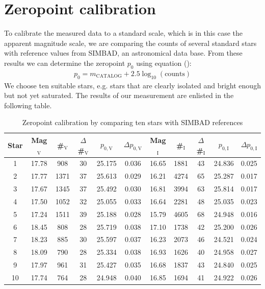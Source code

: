 \section{Zeropoint calibration}\label{sec:zeropoint}
To calibrate the measured data to a standard scale, which is in this case the apparent magnitude scale, we are comparing the counts of several standard stars with reference values from SIMBAD, an astronomical data base. From these results we can determine the zeropoint $p_0$ using equation (): %
	\begin{align}
		p_0 = m_{\text{CATALOG}} + 2.5\log_{10}(\text{counts})
	\end{align}
	We choose ten suitable stars, e.g. stars that are clearly isolated and bright enough but not yet saturated. 
\newpage
The results of our measurement are enlisted in the following table.
	
	\begin{table}[H]
\setlength{\tabcolsep}{2mm}
\renewcommand{\arraystretch}{1.5}
\begin{adjustbox}{width=\textwidth} 
\begin{tabular}{|c||c|c|c|c|c||c|c|c|c|c|}
\hline
Star & Mag$_{\text{V}}$ & \#$_{\text{V}}$ & $\Delta$\#$_{\text{V}}$ & $p_{0,\text{V}}$ &$\Delta p_{0,\text{V}}$ & Mag$_{\text{I}}$ & \#$_{\text{I}}$ & $\Delta$\#$_{\text{I}}$ & $p_{0,\text{I}}$ &$\Delta p_{0,\text{I}}$\\ \hline \hline
1 & 17.78 & 908 & 30 & 25.175 & 0.036 & 16.65 & 1881 & 43 & 24.836 & 0.025 \\
2 & 17.77 & 1371 & 37 & 25.613 & 0.029 & 16.21 & 4274 & 65 & 25.287 & 0.017 \\
3 & 17.67 & 1345 & 37 & 25.492 & 0.030 & 16.81 & 3994 & 63 & 25.814 & 0.017 \\
4 & 17.50 & 1052 & 32 & 25.055 & 0.033 & 16.64 & 2281 & 48 & 25.035 & 0.023 \\
5 & 17.24 & 1511 & 39 & 25.188& 0.028 & 15.79 & 4605 & 68 & 24.948 & 0.016 \\
6 & 18.45 & 808 & 28 & 25.719 & 0.038 & 17.10 & 1738 & 42 &  25.200 & 0.026 \\
7 & 18.23 & 885 & 30 & 25.597 & 0.037 & 16.23 & 2073 & 46 &  24.521 & 0.024 \\
8 & 18.09 & 790 & 28 & 25.334 & 0.038 & 16.93 & 1626 & 40 & 24.958 & 0.027 \\
9 & 17.97 & 961 & 31 & 25.427 & 0.035 & 16.68 & 1837 & 43 &  24.840 & 0.025 \\
10 & 17.74 & 764 & 28 & 24.948 & 0.040 & 16.85 &  1694 & 41 & 24.922 & 0.026 \\
\hline
\end{tabular}
\end{adjustbox}
\caption{\label{tab:2} Zeropoint calibration by comparing ten stars with SIMBAD references}
\end{table}

